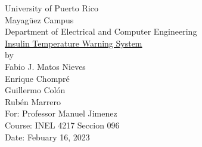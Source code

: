\begin{titlepage}
  \begin{center}
    \large{University of Puerto Rico\\
    Mayagüez Campus\\
    \vspace{\baselineskip}
    Department of Electrical and Computer Engineering\\}
    \vspace{6cm}
    \Huge{\underline{Insulin Temperature Warning System}\\}
    \vspace{0.5\baselineskip}
    \large by\\
    Fabio J. Matos Nieves\\
    Enrique Chompré\\
    Guillermo Colón\\
    Rubén Marrero\\
    \vspace{4cm}
    For: Professor Manuel Jimenez\\
    Course: INEL 4217 Seccion 096\\
    Date: Febuary 16, 2023\\
    \normalsize

  \end{center}
\end{titlepage}
